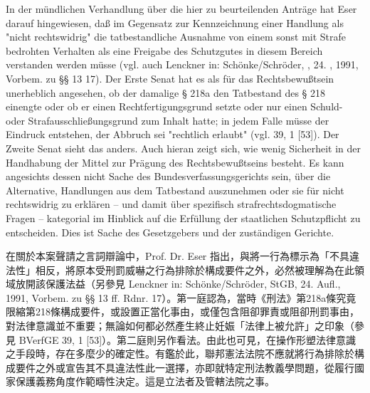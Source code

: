\documentclass[12pt]{article}
\begin{document}
\begin{sourcepara}[title={原文SondervotumMS.306}]
In der mündlichen Verhandlung über die hier zu beurteilenden Anträge hat \abbrProf{} \abbrDr{} Eser darauf hingewiesen, daß im Gegensatz zur Kennzeichnung einer Handlung als "nicht rechtswidrig" die tatbestandliche Ausnahme von einem sonst mit Strafe bedrohten Verhalten als eine Freigabe des Schutzgutes in diesem Bereich verstanden werden müsse (vgl. auch Lenckner in: Schönke/Schröder, \abbrStGB{}, 24. \abbrAufl{}, 1991, Vorbem. zu §§ 13 \abbrFF{} \abbrRdnr{} 17). Der Erste Senat hat es als für das Rechtsbewußtsein unerheblich angesehen, ob der damalige § 218a \abbrStGB{} den Tatbestand des § 218 \abbrStGB{} einengte oder ob er einen Rechtfertigungsgrund setzte oder nur einen Schuld- oder Strafausschließungsgrund zum Inhalt hatte; in jedem Falle müsse der Eindruck entstehen, der Abbruch sei "rechtlich erlaubt" (vgl. \abbrBVerfGE{} 39, 1 [53]). Der Zweite Senat sieht das anders. Auch hieran zeigt sich, wie wenig Sicherheit in der Handhabung der Mittel zur Prägung des Rechtsbewußtseins besteht. Es kann angesichts dessen nicht Sache des Bundesverfassungsgerichts sein, über die Alternative, Handlungen aus dem Tatbestand auszunehmen oder sie für nicht rechtswidrig zu erklären -- und damit über spezifisch strafrechtsdogmatische Fragen -- kategorial im Hinblick auf die Erfüllung der staatlichen Schutzpflicht zu entscheiden. Dies ist Sache des Gesetzgebers und der zuständigen Gerichte.
\end{sourcepara}
\begin{transpara}
在關於本案聲請之言詞辯論中，Prof. Dr. Eser 指出，與將一行為標示為「不具違法性」相反，將原本受刑罰威嚇之行為排除於構成要件之外，必然被理解為在此領域放開該保護法益（另參見 Lenckner in: Schönke/Schröder, StGB, 24. Aufl., 1991, Vorbem. zu §§ 13 ff. Rdnr. 17）。第一庭認為，當時《刑法》第218a條究竟限縮第218條構成要件，或設置正當化事由，或僅包含阻卻罪責或阻卻刑罰事由，對法律意識並不重要；無論如何都必然產生終止妊娠「法律上被允許」之印象（參見 BVerfGE 39, 1 [53]）。第二庭則另作看法。由此也可見，在操作形塑法律意識之手段時，存在多麼少的確定性。有鑑於此，聯邦憲法法院不應就將行為排除於構成要件之外或宣告其不具違法性此一選擇，亦即就特定刑法教義學問題，從履行國家保護義務角度作範疇性決定。這是立法者及管轄法院之事。
\end{transpara}

\end{document}
